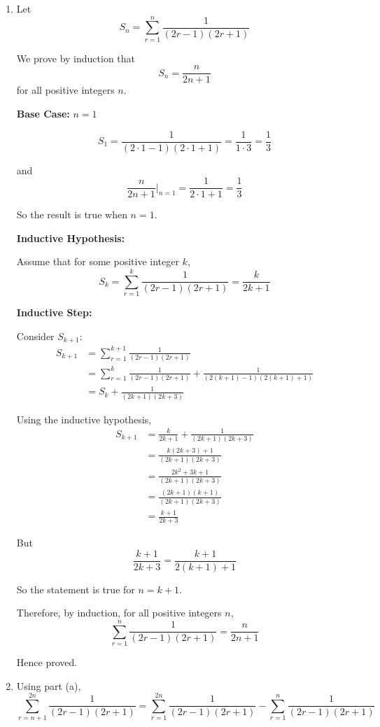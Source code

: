 \documentclass[leqno]{article}
\begin{document}
\begin{enumerate}[
  label=\textbf{\arabic*.},
  leftmargin=*,
  topsep=0pt,
  partopsep=0pt,
  parsep=0pt
]
\vspace*{30pt}

\begin{tcolorbox}[colback=white, colframe=scarlet, title={\textbf{Solution}}, breakable, grow to left by=6mm, grow to right by=10mm]
\begin{enumerate}[label=\textbf{(\alph*)}]
\item Let
\[
S_n=\sum_{r=1}^{n}\frac{1}{(2r-1)(2r+1)}
\]

We prove by induction that
\[
S_n=\frac{n}{2n+1}
\]
for all positive integers $n$.

\textbf{Base Case:} $n=1$

\[
S_1=\frac{1}{(2\cdot1-1)(2\cdot1+1)}=\frac{1}{1\cdot3}=\frac13
\]

and
\[
\frac{n}{2n+1}\Bigg|_{n=1}=\frac{1}{2\cdot1+1}=\frac13
\]

So the result is true when $n=1$.

\textbf{Inductive Hypothesis:}

Assume that for some positive integer $k$,
\[
S_k=\sum_{r=1}^{k}\frac{1}{(2r-1)(2r+1)}=\frac{k}{2k+1}
\]

\textbf{Inductive Step:}

Consider $S_{k+1}$:
\begin{align*}
S_{k+1}
&=\sum_{r=1}^{k+1}\frac{1}{(2r-1)(2r+1)} \\
&=\sum_{r=1}^{k}\frac{1}{(2r-1)(2r+1)}+\frac{1}{(2(k+1)-1)(2(k+1)+1)} \\
&=S_k+\frac{1}{(2k+1)(2k+3)}
\end{align*}

Using the inductive hypothesis,
\begin{align*}
S_{k+1}
&=\frac{k}{2k+1}+\frac{1}{(2k+1)(2k+3)} \\
&=\frac{k(2k+3)+1}{(2k+1)(2k+3)} \\
&=\frac{2k^2+3k+1}{(2k+1)(2k+3)} \\
&=\frac{(2k+1)(k+1)}{(2k+1)(2k+3)} \\
&=\frac{k+1}{2k+3}
\end{align*}

But
\[
\frac{k+1}{2k+3}=\frac{k+1}{2(k+1)+1}
\]

So the statement is true for $n=k+1$.

Therefore, by induction, for all positive integers $n$,
\[
\sum_{r=1}^{n}\frac{1}{(2r-1)(2r+1)}=\frac{n}{2n+1}
\]

Hence proved.

\item Using part (a),
\[
\sum_{r=n+1}^{2n}\frac{1}{(2r-1)(2r+1)}
=
\sum_{r=1}^{2n}\frac{1}{(2r-1)(2r+1)}
-
\sum_{r=1}^{n}\frac{1}{(2r-1)(2r+1)}
\]


\end{enumerate}
\end{tcolorbox}
\end{enumerate}
\end{document}
